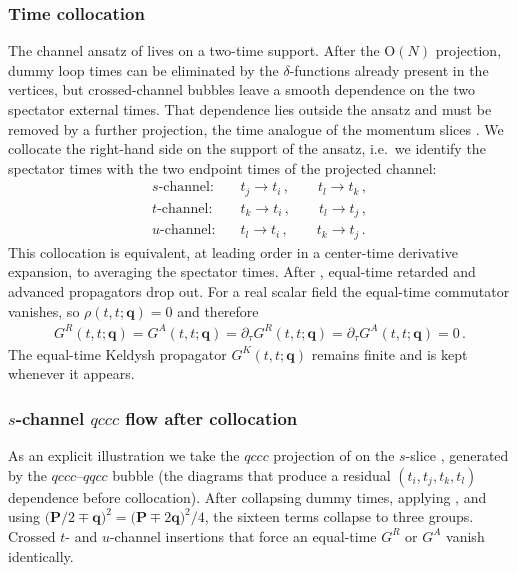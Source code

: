 \documentclass[reprint,english,superscriptaddress,preprintnumbers,amsmath,amssymb,aps,prd]{revtex4-1}
\makeatletter
\newcommand*{\ie}{i.e.\@\xspace}
\makeatother
\begin{document}
\subsubsection{Time collocation}
\label{sec:time-slice}

The channel ansatz of  lives on a two-time support. After the $\mathrm{O}(N)$ projection, dummy loop times can be eliminated by the $\delta$-functions already present in the vertices, but crossed-channel bubbles leave a smooth dependence on the two spectator external times. That dependence lies outside the ansatz and must be removed by a further projection, the time analogue of the momentum slices . We collocate the right-hand side on the support of the ansatz, \ie\ we identify the spectator times with the two endpoint times of the projected channel:
\begin{align}
    s\text{-channel:}&\quad t_j\to t_i\,,\qquad t_l\to t_k\,,\nonumber\\[1ex]
    t\text{-channel:}&\quad t_k\to t_i\,,\qquad t_l\to t_j\,,\nonumber\\[1ex]
    u\text{-channel:}&\quad t_l\to t_i\,,\qquad t_k\to t_j\,.
    \label{eq:time-slice}
\end{align}
This collocation is equivalent, at leading order in a center-time derivative expansion, to averaging the spectator times. After , equal-time retarded and advanced propagators drop out. For a real scalar field the equal-time commutator vanishes, so $\rho(t,t;\boldsymbol{q})=0$ and therefore
\begin{align}
    G^{R}(t,t;\boldsymbol{q})=G^{A}(t,t;\boldsymbol{q})=\partial_{\tau}G^{R}(t,t;\boldsymbol{q})=\partial_{\tau}G^{A}(t,t;\boldsymbol{q})=0\,.
    \label{eq:equal-time-RA}
\end{align}
The equal-time Keldysh propagator $G^{K}(t,t;\boldsymbol{q})$ remains finite and is kept whenever it appears.

\subsubsection{$s$-channel $qccc$ flow after collocation}

As an explicit illustration we take the $qccc$ projection of  on the $s$-slice , generated by the $qccc$--$qqcc$ bubble (the diagrams that produce a residual $(t_i,t_j,t_k,t_l)$ dependence before collocation). After collapsing dummy times, applying , and using $\bigl(\boldsymbol{P}/2\mp\boldsymbol{q}\bigr)^{2}=\bigl(\boldsymbol{P}\mp 2\boldsymbol{q}\bigr)^{2}/4$, the sixteen terms collapse to three groups. Crossed $t$- and $u$-channel insertions that force an equal-time $G^{R}$ or $G^{A}$ vanish identically.
\end{document}
